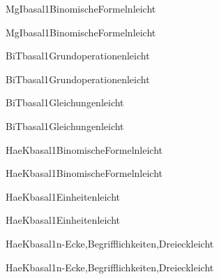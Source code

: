 \documentclass[12pt]{article}
\begin{document}
\pagecolor{lightgray!30}

\begin{Add}{MgI}{basal1}{BinomischeFormeln}{leicht}
\solution{ }
\end{Add}
\begin{Add}{MgI}{basal1}{BinomischeFormeln}{leicht}
\end{Add}

\begin{Add}{BiT}{basal1}{Grundoperationen}{leicht}
\solution{ }
\end{Add}
\begin{Add}{BiT}{basal1}{Grundoperationen}{leicht}
\end{Add}

\begin{Add}{BiT}{basal1}{Gleichungen}{leicht}
\solution{ }
\end{Add}
\begin{Add}{BiT}{basal1}{Gleichungen}{leicht}
\end{Add}

\begin{Add}{HaeK}{basal1}{BinomischeFormeln}{leicht}
\solution{ }
\end{Add}
\begin{Add}{HaeK}{basal1}{BinomischeFormeln}{leicht}
\end{Add}

\begin{Add}{HaeK}{basal1}{Einheiten}{leicht}
\solution{ }
\end{Add}
\begin{Add}{HaeK}{basal1}{Einheiten}{leicht}
\end{Add}

\begin{Add}{HaeK}{basal1}{n-Ecke,Begrifflichkeiten,Dreieck}{leicht}
\solution{ }
\end{Add}
\begin{Add}{HaeK}{basal1}{n-Ecke,Begrifflichkeiten,Dreieck}{leicht}
\end{Add}
\end{document}
